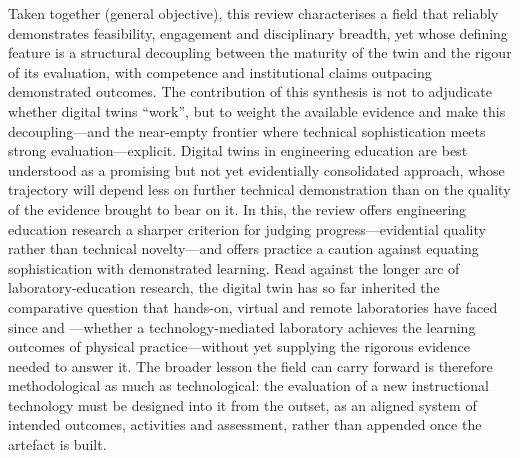 Taken together (general objective), this review characterises a field that
reliably demonstrates feasibility, engagement and disciplinary breadth, yet whose
defining feature is a structural decoupling between the maturity of the twin and
the rigour of its evaluation, with competence and institutional claims outpacing
demonstrated outcomes. The contribution of this synthesis is not to adjudicate
whether digital twins ``work'', but to weight the available evidence and make this
decoupling---and the near-empty frontier where technical sophistication meets strong
evaluation---explicit. Digital twins in engineering education are best understood as
a promising but not yet evidentially consolidated approach, whose trajectory will
depend less on further technical demonstration than on the quality of the evidence
brought to bear on it. In this, the review offers engineering education research a
sharper criterion for judging progress---evidential quality rather than technical
novelty---and offers practice a caution against equating sophistication with
demonstrated learning. Read against the longer arc of laboratory-education
research, the digital twin has so far inherited the comparative question that
hands-on, virtual and remote laboratories have faced since \citet{ma_handson_2006} and
\citet{brinson_learning_2015}---whether a technology-mediated laboratory achieves the
learning outcomes of physical practice---without yet supplying the rigorous evidence
needed to answer it. The broader lesson the field can carry forward is therefore
methodological as much as technological: the evaluation of a new instructional
technology must be designed into it from the outset, as an aligned system of
intended outcomes, activities and assessment, rather than appended once the
artefact is built.

